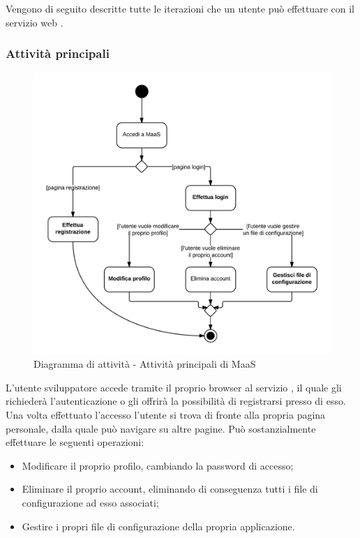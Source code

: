 Vengono di seguito descritte tutte le iterazioni che un utente può effettuare con il servizio web .

\subsubsection{Attività principali}

\begin{figure}[H]
\centering
\includegraphics[scale=0.2]{uml/MaaS - Attivita principali.png}
\caption{Diagramma di attività - Attività principali di MaaS}
\end{figure}

L'utente sviluppatore accede tramite il proprio browser al servizio , il quale gli richiederà l'autenticazione o gli offrirà la possibilità di registrarsi presso di esso. Una volta effettuato l'accesso l'utente si trova di fronte alla propria pagina personale, dalla quale può navigare su altre pagine. Può sostanzialmente effettuare le seguenti operazioni:

\begin{itemize}

	\item Modificare il proprio profilo, cambiando la password di accesso;
	\item Eliminare il proprio account, eliminando di conseguenza tutti i file di configurazione ad esso associati;
	\item Gestire i propri file di configurazione della propria applicazione.

\end{itemize}

